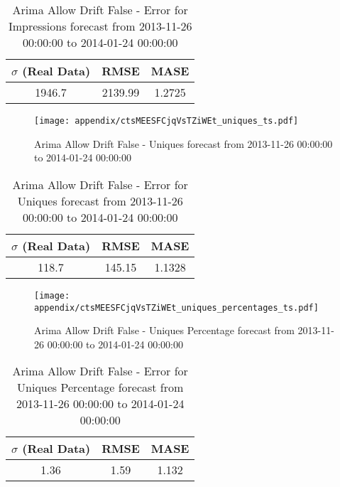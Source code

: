 \begin{table}[H]
\centering
\footnotesize
\begin{tabular}{ccc}
$\sigma$ (Real Data) & RMSE & MASE   \\ \hline
1946.7 & 2139.99 & 1.2725 \\
\end{tabular}

\vspace{0.5cm}

\caption{
Arima Allow Drift False - Error for Impressions forecast from 2013-11-26 00:00:00 to 2014-01-24 00:00:00}
\end{table}

\begin{figure}[H] \begin{center} \leavevmode
\texttt{[image: appendix/ctsMEESFCjqVsTZiWEt\_uniques\_ts.pdf]} \caption{
Arima Allow Drift False - Uniques forecast from 2013-11-26 00:00:00 to 2014-01-24 00:00:00} \label{fig:appendix/ctsMEESFCjqVsTZiWEt_uniques_ts.pdf} \end{center}
\end{figure}

\begin{table}[H]
\centering
\footnotesize
\begin{tabular}{ccc}
$\sigma$ (Real Data) & RMSE & MASE   \\ \hline
118.7 & 145.15 & 1.1328 \\
\end{tabular}

\vspace{0.5cm}

\caption{
Arima Allow Drift False - Error for Uniques forecast from 2013-11-26 00:00:00 to 2014-01-24 00:00:00}
\end{table}

\begin{figure}[H] \begin{center} \leavevmode
\texttt{[image: appendix/ctsMEESFCjqVsTZiWEt\_uniques\_percentages\_ts.pdf]} \caption{
Arima Allow Drift False - Uniques Percentage forecast from 2013-11-26 00:00:00 to 2014-01-24 00:00:00} \label{fig:appendix/ctsMEESFCjqVsTZiWEt_uniques_percentages_ts.pdf} \end{center}
\end{figure}

\begin{table}[H]
\centering
\footnotesize
\begin{tabular}{ccc}
$\sigma$ (Real Data) & RMSE & MASE   \\ \hline
1.36 & 1.59 & 1.132 \\
\end{tabular}

\vspace{0.5cm}

\caption{
Arima Allow Drift False - Error for Uniques Percentage forecast from 2013-11-26 00:00:00 to 2014-01-24 00:00:00}
\end{table}

